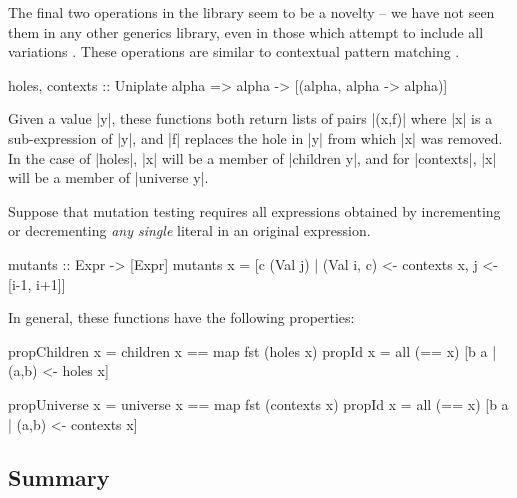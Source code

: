 
The final two operations in the library seem to be a novelty -- we have not seen them in any other generics library, even in those which attempt to include all variations \citep{ren:generic_recursion_toolbox}. These operations are similar to contextual pattern matching \citep{mohnen:context_patterns}.

\begin{code}
holes, contexts :: Uniplate alpha => alpha -> [(alpha, alpha -> alpha)]
\end{code}

Given a value |y|, these functions both return lists of pairs |(x,f)| where |x| is a sub-expression of |y|, and |f| replaces the hole in |y| from which |x| was removed. In the case of |holes|, |x| will be a member of |children y|, and for |contexts|, |x| will be a member of |universe y|.

\begin{example}
Suppose that mutation testing requires all expressions obtained by incrementing or decrementing \textit{any single} literal in an original expression.

\begin{code}
mutants :: Expr -> [Expr]
mutants x =  [c (Val j) | (Val i, c) <- contexts x,  j <- [i-1, i+1]]
\end{code}
\end{example}

In general, these functions have the following properties:

\begin{code}
propChildren  x = children x == map fst (holes    x)
propId        x = all (== x) [b a | (a,b) <- holes     x]
\end{code}
\begin{code}
propUniverse  x = universe x == map fst (contexts x)
propId        x = all (== x) [b a | (a,b) <- contexts  x]
\end{code}


\subsection{Summary}

